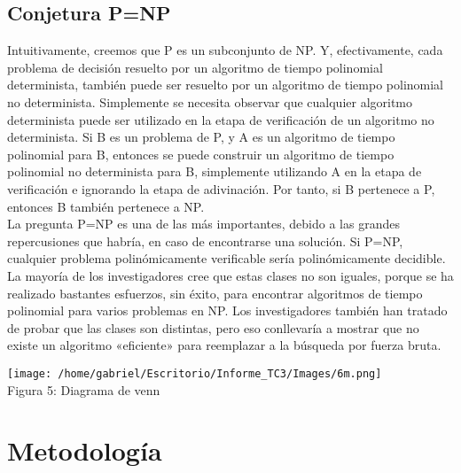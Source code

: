 \documentclass[12pt]{report}
\begin{document}
\section{Conjetura P=NP}
Intuitivamente, creemos que P es un subconjunto de NP. Y, efectivamente, cada problema de decisión resuelto por un algoritmo de tiempo polinomial determinista, también puede ser resuelto por un algoritmo de tiempo polinomial no determinista. Simplemente se necesita observar que cualquier algoritmo determinista puede ser utilizado en la etapa de verificación de un algoritmo no determinista. Si B es un problema de P, y A es un algoritmo de tiempo polinomial para B, entonces se puede construir un algoritmo de tiempo polinomial no determinista para B, simplemente utilizando A en la etapa de verificación e ignorando la etapa de adivinación. Por tanto, si B pertenece a P, entonces B también pertenece a NP.\\
La pregunta P=NP es una de las más importantes, debido a las grandes repercusiones que habría, en caso de encontrarse una solución. Si P=NP, cualquier problema polinómicamente verificable sería polinómicamente decidible. La mayoría de los investigadores cree que estas clases no son iguales, porque se ha realizado bastantes esfuerzos, sin éxito, para encontrar algoritmos de tiempo polinomial para varios problemas en NP. Los investigadores también han tratado de probar que las clases son distintas, pero eso conllevaría a mostrar que no existe un algoritmo «eficiente» para reemplazar a la búsqueda por fuerza bruta.
\begin{center}
\texttt{[image: /home/gabriel/Escritorio/Informe\_TC3/Images/6m.png]}\\
Figura 5: Diagrama de venn
\end{center}

\chapter{Metodología}
\end{document}
